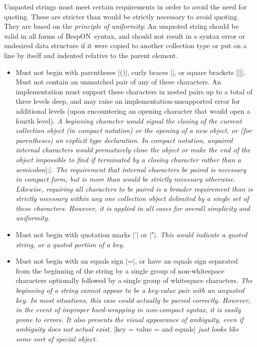 \documentclass[11pt]{article}
\newcommand{\bespon}{BespON}
\begin{document}
Unquoted strings must meet certain requirements in order to avoid the need for quoting.  These are stricter than would be strictly necessary to avoid quoting.  They are based on the \textit{principle of uniformity}:  An unquoted string should be valid in all forms of \bespon\ syntax, and should not result in a syntax error or undesired data structure if it were copied to another collection type or put on a line by itself and indented relative to the parent element.
\begin{itemize}
\item Must not begin with parentheses |()|, curly braces |{}|, or square brackets |[]|.  Must not contain an unmatched pair of any of these characters.  An implementation must support these characters in nested pairs up to a total of three levels deep, and may raise an implementation-unsupported error for additional levels (upon encountering an opening character that would open a fourth level).  \textit{A beginning character would signal the closing of the current collection object (in compact notation) or the opening of a new object, or (for parentheses) an explicit type declaration.  In compact notation, unpaired internal characters would prematurely close the object or make the end of the object impossible to find if terminated by a closing character rather than a semicolon}|;|\textit{.  The requirement that internal characters be paired is necessary in compact form, but is more than would be strictly necessary otherwise.  Likewise, requiring all characters to be paired is a broader requirement than is strictly necessary within any one collection object delimited by a single set of these characters.  However, it is applied in all cases for overall simplicity and uniformity.}
\item Must not begin with quotation marks |'| or |"|.  \textit{This would indicate a quoted string, or a quoted portion of a key.}
\item Must not begin with an equals sign |=|, or have an equals sign separated from the beginning of the string by a single group of non-whitespace characters optionally followed by a single group of whitespace characters.  \textit{The beginning of a string cannot appear to be a key-value pair with an unquoted key.  In most situations, this case could actually be parsed correctly.  However, in the event of improper hard-wrapping in non-compact syntax, it is easily prone to errors.  It also presents the visual appearance of ambiguity, even if ambiguity does not actual exist.  }|key = value = and equals|\textit{ just looks like some sort of special object.}

\end{itemize}
\end{document}
